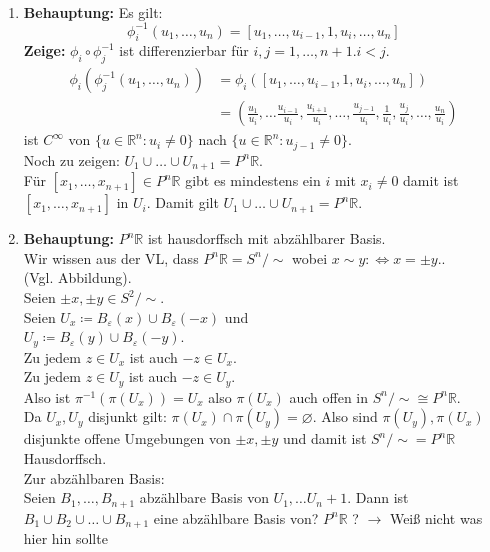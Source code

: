 \begin{solution}
  \
  \begin{enumerate}[label= (\alph*)]
    \item \textbf{Behauptung:} Es gilt:
    \begin{equation*}
      \phi_i^{-1} (u_1, \dots , u_{n}) = [u_1, \dots , u_{i-1}, 1, u_i, \dots , u_n]
    \end{equation*}
    \textbf{Zeige:} \( \phi_i \circ \phi^{-1}_j \) ist differenzierbar für \( i,j = 1, \dots, n+1. i < j \).
    \begin{align*}
      \phi_i (\phi_j^{-1} (u_1, \dots , u_{n})) &= \phi_i([u_1, \dots , u_{i-1}, 1, u_i, \dots , u_n]) \\
      &= \left( 
      \frac{u_1}{u_i}, \dots \frac{u_{i-1}}{u_i}, \frac{u_{i+1}}{u_i}, \dots , \frac{u_{j-1}}{u_i}, \frac{1}{u_i}, \frac{u_{j}}{u_i}, \dots, \frac{u_n}{u_i} 
      \right)
    \end{align*}
    ist \( C^{\infty} \) von \( \{ u \in \mathbb{R}^n : u_i \neq 0 \} \) nach \( \{ u \in \mathbb{R}^n : u_{j-1} \neq 0 \} \). \\
    Noch zu zeigen: \( U_1 \cup \dots \cup U_{n+1} = P^n\mathbb{R} \). \\
    Für \( [x_1, \dots , x_{n+1}] \in P^n\mathbb{R} \) gibt es mindestens ein \( i \) mit \( x_i \neq 0 \) damit ist \( [x_1, \dots , x_{n+1}] \) in \( U_i \). Damit gilt \( U_1 \cup \dots \cup U_{n+1} = P^n\mathbb{R} \).
    
    \item \textbf{Behauptung:} \( P^n\mathbb{R} \) ist hausdorffsch mit abzählbarer Basis. \\
    Wir wissen aus der VL, dass \( P^n\mathbb{R} = S^n / \sim \) wobei \( x \sim y :\Leftrightarrow x = \pm y. \). \\
    (Vgl. Abbildung). \\
    Seien \( \pm x, \pm y \in S^2 / \sim \). \\
    Seien \( U_x \coloneqq B_\varepsilon(x) \cup B_\varepsilon(-x) \) und \\
    \( U_y \coloneqq B_\varepsilon(y) \cup B_\varepsilon(-y) \). \\
    Zu jedem \( z \in U_x \) ist auch \( -z \in U_x \). \\
    Zu jedem \( z \in U_y \) ist auch \( -z \in U_y \). \\
    Also ist \( \pi^{-1} (\pi(U_x)) = U_x \) also \( \pi(U_x) \) auch offen in \( S^n / \sim \cong P^n\mathbb{R} \). \\
    Da \( U_x, U_y \) disjunkt gilt: \( \pi(U_x) \cap \pi(U_y) = \varnothing \). Also sind \( \pi(U_y), \pi(U_x) \) disjunkte offene Umgebungen von \( \pm x, \pm y \) und damit ist \( S^n / \sim = P^n\mathbb{R} \) Hausdorffsch. \\
    Zur abzählbaren Basis: \\
    Seien \( B_1, \dots, B_{n+1} \) abzählbare Basis von \( U_1, \dots U_n+1 \). Dann ist \( B_1 \cup B_2 \cup \dots \cup B_{n+1} \) eine abzählbare Basis von? \( P^n\mathbb{R} \) \quad? \( \to \) Weiß nicht was hier hin sollte %
  \end{enumerate}
\end{solution}


